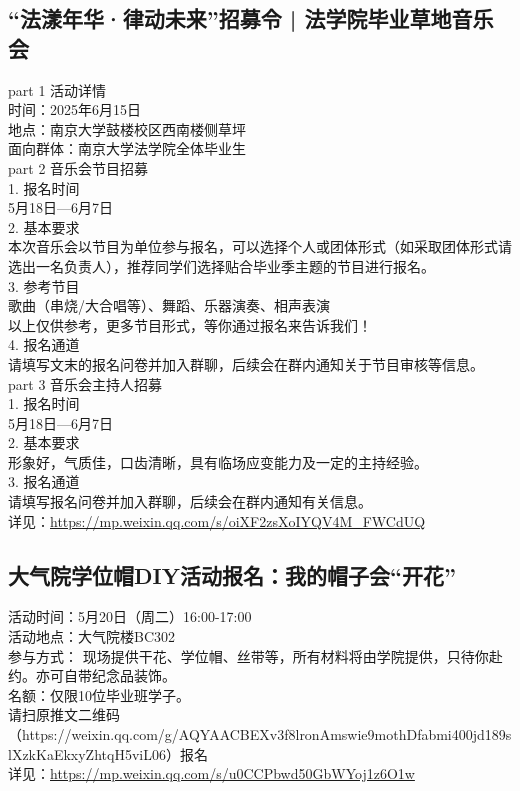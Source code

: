 \documentclass[letterpaper, 12pt]{article}
\begin{document}
\begin{multicols}{2}
\subsection{“法漾年华·律动未来”招募令 | 法学院毕业草地音乐会} %
part 1 活动详情
\\时间：2025年6月15日
\\地点：南京大学鼓楼校区西南楼侧草坪
\\面向群体：南京大学法学院全体毕业生
\\part 2 音乐会节目招募
\\1. 报名时间
\\5月18日—6月7日
\\2. 基本要求
\\本次音乐会以节目为单位参与报名，可以选择个人或团体形式（如采取团体形式请选出一名负责人），推荐同学们选择贴合毕业季主题的节目进行报名。
\\3. 参考节目
\\歌曲（串烧/大合唱等）、舞蹈、乐器演奏、相声表演
\\以上仅供参考，更多节目形式，等你通过报名来告诉我们！
\\4. 报名通道
\\请填写文末的报名问卷并加入群聊，后续会在群内通知关于节目审核等信息。
\\part 3 音乐会主持人招募
\\1. 报名时间
\\5月18日—6月7日
\\2. 基本要求
\\形象好，气质佳，口齿清晰，具有临场应变能力及一定的主持经验。
\\3. 报名通道
\\请填写报名问卷并加入群聊，后续会在群内通知有关信息。
\\详见：\url{https://mp.weixin.qq.com/s/oiXF2zsXoIYQV4M_FWCdUQ}

\subsection{大气院学位帽DIY活动报名：我的帽子会“开花”} %
活动时间：5月20日（周二）16:00-17:00
\\活动地点：大气院楼BC302
\\参与方式： 现场提供干花、学位帽、丝带等，所有材料将由学院提供，只待你赴约。亦可自带纪念品装饰。
\\名额：仅限10位毕业班学子。
\\请扫原推文二维码（https://weixin.qq.com/g/AQYAACBEXv3f8lronAmswie9mothDfabmi400jd189slXzkKaEkxyZhtqH5viL06）报名
\\详见：\url{https://mp.weixin.qq.com/s/u0CCPbwd50GbWYoj1z6O1w}


\end{multicols}
\end{document}
